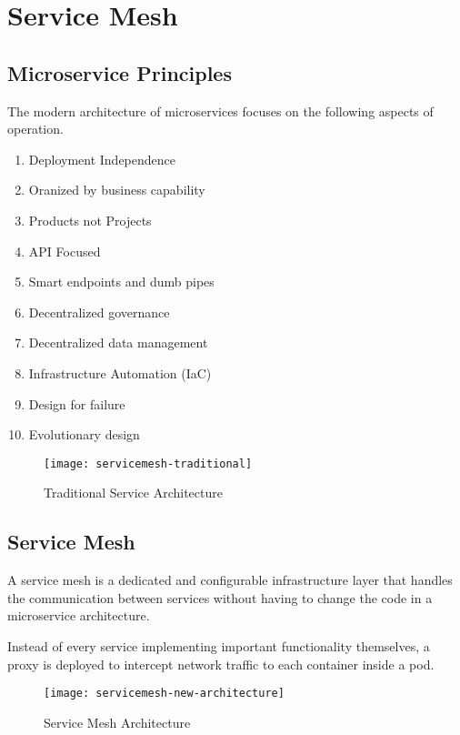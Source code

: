 \section{Service Mesh}

\subsection{Microservice Principles}
The modern architecture of microservices focuses on the following aspects of operation. 
\begin{enumerate}
    \item Deployment Independence
    \item Oranized by business capability
    \item Products not Projects
    \item API Focused
    \item Smart endpoints and dumb pipes
    \item Decentralized governance
    \item Decentralized data management
    \item Infrastructure Automation (IaC)
    \item Design for failure
    \item Evolutionary design
\end{enumerate}

\begin{figure}[h]
    \centering
    \texttt{[image: servicemesh-traditional]}
    \caption{Traditional Service Architecture}
\end{figure}

\subsection{Service Mesh}

A service mesh is a dedicated and configurable infrastructure layer that handles the communication between services without having to change the code in a microservice architecture. 

Instead of every service implementing important functionality themselves, a proxy is deployed to intercept network traffic to each container inside a pod.

\begin{figure}[h]
    \centering
    \texttt{[image: servicemesh-new-architecture]}
    \caption{Service Mesh Architecture}
\end{figure}

